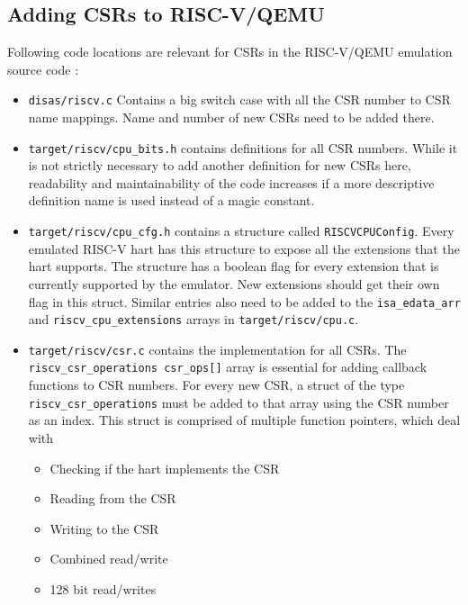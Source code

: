 

\subsection{Adding CSRs to RISC-V/QEMU}

Following code locations are relevant for CSRs in the RISC-V/QEMU emulation source code \cite{QEMUSource2024}:
\begin{itemize}
    \item \texttt{disas/riscv.c} Contains a big switch case with all the CSR number to CSR name mappings.
          Name and number of new CSRs need to be added there.
    \item \texttt{target/riscv/cpu\_bits.h} contains definitions for all CSR numbers.
          While it is not strictly necessary to add another definition for new CSRs here, readability and maintainability
          of the code increases if a more descriptive definition name is used instead of a magic constant.
    \item \texttt{target/riscv/cpu\_cfg.h} contains a structure called \texttt{RISCVCPUConfig}. Every emulated RISC-V hart
          has this structure to expose all the extensions that the hart supports. 
          The structure has a boolean flag for every extension that is currently supported by the emulator.
          New extensions should get their own flag in this struct.
          Similar entries also need to be added to the \texttt{isa\_edata\_arr} and \texttt{riscv\_cpu\_extensions} arrays in \texttt{target/riscv/cpu.c}.
    \item \texttt{target/riscv/csr.c} contains the implementation for all CSRs. The \texttt{riscv\_csr\_operations csr\_ops[]}
          array is essential for adding callback functions to CSR numbers.
          For every new CSR, a struct of the type \texttt{riscv\_csr\_operations} must be added to that array using the
          CSR number as an index. This struct is comprised of multiple function pointers, which deal with
          \begin{itemize}
              \item Checking if the hart implements the CSR
              \item Reading from the CSR
              \item Writing to the CSR
              \item Combined read/write
              \item 128 bit read/writes
          \end{itemize}
\end{itemize}

